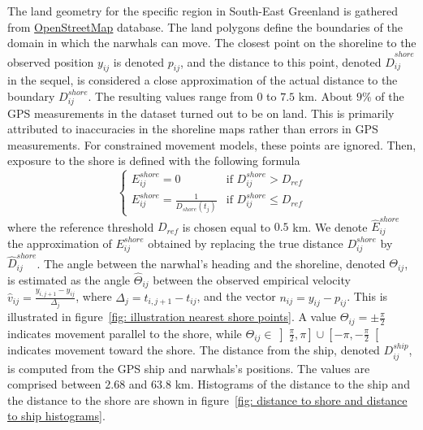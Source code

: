 \documentclass[11pt]{article}
\newcommand {\1}{\mathbb{1}}
\begin{document}
The land geometry for the specific region in South-East Greenland is gathered from \href{https://www.openstreetmap.org/#map=11/70.4029/-27.2928}{OpenStreetMap} database. The land polygons define the boundaries of the domain in which the narwhals can move. The closest point on the shoreline to the observed position $y_{ij}$  is denoted $p_{ij}$, and the distance to this point, denoted $\hat{D}^{shore}_{ij}$ in the sequel, is considered a close approximation of the actual distance to the boundary $D^{shore}_{ij}$. The resulting values range from $0$ to $7.5$ km. About $9\%$ of the GPS measurements in the dataset turned out to be on land. This is primarily attributed to inaccuracies in the shoreline maps rather than errors in GPS measurements. For constrained movement models, these points are ignored. Then, exposure to the shore is defined with the following formula
\begin{equation}
\left\{
\begin{array}{ll}
	 E^{shore}_{ij}=0 & \mbox{if } D^{shore}_{ij}>D_{ref} \\
	E^{shore}_{ij}=\frac{1}{D_{shore}(t_j)} & \mbox{if } D^{shore}_{ij} \leq D_{ref}
\end{array}
\right.
\label{eq: exp shore definition}
\end{equation}
where the reference threshold $D_{ref}$ is chosen equal to $0.5$ km. We denote $\hat{E}^{shore}_{ij}$ the approximation of $E^{shore}_{ij}$ obtained by replacing the true distance $D^{shore}_{ij}$ by $\hat{D}^{shore}_{ij}$.
The angle between the narwhal's heading and the shoreline, denoted $\Theta_{ij}$, is estimated as the angle $\hat{\Theta}_{ij}$ between the observed empirical velocity $\hat{v}_{ij}=\frac{y_{i,j+1}-y_{ij}}{\Delta_j}$, where $\Delta_j=t_{i,j+1}-t_{ij}$, and the vector $n_{ij}=y_{ij}-p_{ij}$. This is illustrated in figure~\ref{fig: illustration nearest shore points}. A value $\Theta_{ij}=\pm \frac{\pi}{2}$ indicates movement parallel to the shore, while $\Theta_{ij} \in \left]\frac{\pi}{2},\pi\right] \cup \left[-\pi,-\frac{\pi}{2}\right[$ indicates movement toward the shore. 
The distance from the ship, denoted $D^{ship}_{ij}$, is computed from the GPS ship and narwhals's positions. The values are comprised between $2.68$ and $63.8$ km.
Histograms of the distance to the ship and the distance to the shore are shown in figure~\ref{fig: distance to shore and distance to ship histograms}.
\end{document}
